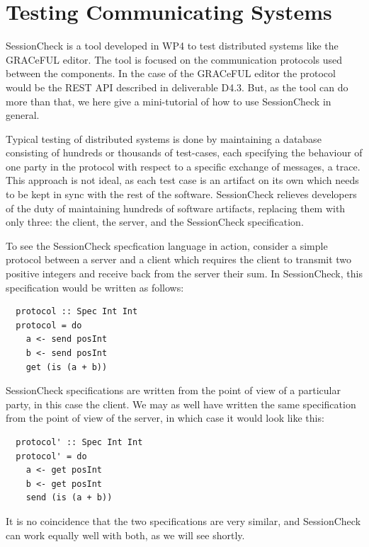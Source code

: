 \documentclass{article}
\begin{document}
\section{Testing Communicating Systems}
\label{sec:SessionCheck}
%
SessionCheck \cite{SessionCheck} is a tool developed in WP4 to test distributed systems like
the GRACeFUL editor.
%
The tool is focused on the communication protocols used between the components.
%
In the case of the GRACeFUL editor the protocol would be the REST API described in deliverable D4.3. %
%
But, as the tool can do more than that, we here give a mini-tutorial
of how to use SessionCheck in general.

Typical testing of distributed systems is done by maintaining a database consisting of hundreds
or thousands of test-cases, each specifying the behaviour of one party in the protocol with
respect to a specific exchange of messages, a trace.
%
This approach is not ideal, as each test case is an artifact on its own which needs to be kept
in sync with the rest of the software.
%
SessionCheck relieves developers of the duty of maintaining hundreds of software
artifacts, replacing them with only three: the client, the server, and the SessionCheck specification.

To see the SessionCheck specfication language in action, consider a
simple protocol between a server and a client which requires the
client to transmit two positive integers and receive back from the
server their sum.
%
In SessionCheck, this specification would be written as follows:
%

\begin{verbatim}
  protocol :: Spec Int Int
  protocol = do
    a <- send posInt
    b <- send posInt
    get (is (a + b))
\end{verbatim}

%
SessionCheck specifications are written from the point of view of a particular party, in this case the client.
%
We may as well have written the same specification from the point of view of the server,
in which case it would look like this:
%

\begin{verbatim}
  protocol' :: Spec Int Int
  protocol' = do
    a <- get posInt
    b <- get posInt
    send (is (a + b))
  \end{verbatim}

%
It is no coincidence that the two specifications are very similar, and SessionCheck can work equally well with
both, as we will see shortly.
\end{document}
